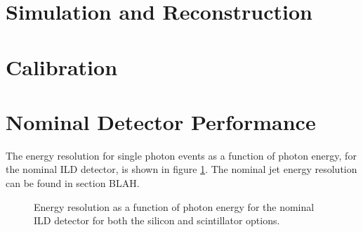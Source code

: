 \section{Simulation and Reconstruction}

\section{Calibration}

\section{Nominal Detector Performance}
The energy resolution for single photon events as a function of photon energy, for the nominal ILD detector, is shown in figure \ref{fig:ecalnominalres}.  The nominal jet energy resolution can be found in section BLAH.

\begin{figure}
\centering
{}
\caption[Energy resolution as a function of photon energy for the nominal ILD detector for both the silicon and scintillator options.]{Energy resolution as a function of photon energy for the nominal ILD detector for both the silicon and scintillator options.}
\label{fig:ecalnominalres}
\end{figure}

